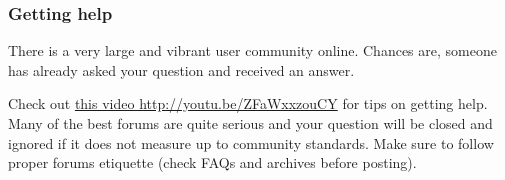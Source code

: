 \documentclass[11pt,ignorenonframetext,]{beamer}
\begin{document}
\begin{frame}\frametitle{Getting help}

There is a very large and vibrant user community online. Chances are,
someone has already asked your question and received an answer.

Check out \href{http://youtu.be/ZFaWxxzouCY}{this video
http://youtu.be/ZFaWxxzouCY} for tips on getting help. Many of the best
forums are quite serious and your question will be closed and ignored if
it does not measure up to community standards. Make sure to follow
proper forums etiquette (check FAQs and archives before posting).

\end{frame}
\end{document}
